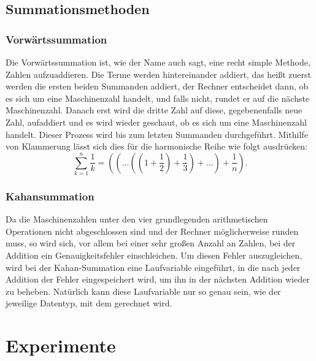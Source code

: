 \documentclass{scrartcl}
\begin{document}
\subsection{Summationsmethoden} \subsubsection{Vorwärtssummation} Die Vorwärtssummation ist, wie der Name auch
                                  sagt, eine recht simple Methode, Zahlen
                                  aufzuaddieren. Die Terme werden
                                  hintereinander addiert, das heißt zuerst
                                  werden die ersten beiden Summanden addiert,
                                  der Rechner entscheidet dann, ob es sich um
                                  eine Maschinenzahl handelt, und falls nicht,
                                  rundet er auf die nächste Maschinenzahl.
                                  Danach erst wird die dritte Zahl auf diese,
                                  gegebenenfalls neue Zahl, aufaddiert und es
                                  wird wieder geschaut, ob es sich um eine
                                  Maschinenzahl handelt. Dieser Prozess wird
                                  bis zum letzten Summanden durchgeführt.
                                  Mithilfe von Klammerung lässt sich dies für
                                  die harmonische Reihe wie folgt ausdrücken:
\begin{equation*}
    \sum_{k=1}^{n} \frac{1}{k} = ((\ldots((1 + \frac{1}{2}) + \frac{1}{3}) + \ldots) + \frac{1}{n}).
\end{equation*}

\subsubsection{Kahansummation}
Da die Maschinenzahlen unter den vier grundlegenden arithmetischen Operationen
nicht abgeschlossen sind und der Rechner möglicherweise runden muss, so wird
sich, vor allem bei einer sehr großen Anzahl an Zahlen, bei der Addition ein
Genauigkeitsfehler einschleichen. Um diesen Fehler auszugleichen, wird bei der
Kahan-Summation eine Laufvariable eingeführt, in die nach jeder Addition der
Fehler eingespeichert wird, um ihn in der nächsten Addition wieder zu beheben.
Natürlich kann diese Laufvariable nur so genau sein, wie der jeweilige
Datentyp, mit dem gerechnet wird.

\section{Experimente}
\end{document}
